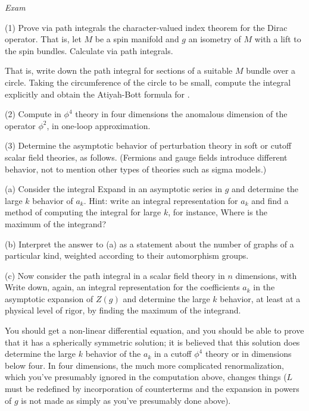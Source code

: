 

\overfullrule=0pt
{\it Exam}

(1) Prove via path integrals the character-valued index theorem for the Dirac 
operator.
That is, let $M$ be a spin manifold and $g$ an isometry of $M$ with a lift to 
the
spin bundles.  Calculate
\eqn{}
via path integrals.

That is, write down the path integral for sections of a suitable $M$ bundle
over a circle.  Taking the circumference of the circle to be small, compute
the integral explicitly and obtain the Atiyah-Bott formula for \hgg.

(2) Compute in $\phi^4$ theory in four dimensions the anomalous dimension of 
the
operator $\phi^2$, in one-loop approximation.

(3) Determine the asymptotic behavior of perturbation theory in soft or cutoff
scalar field theories, as follows.  (Fermions and gauge fields introduce 
different
behavior, not to mention other types of theories such as sigma models.)

(a) Consider the integral
\eqn{}
Expand in an asymptotic series in $g$
\eqn{}
and determine the large $k$ behavior of $a_k$.   Hint: write an integral 
representation
for $a_k$ and find a method of computing the integral for large $k$, for 
instance,
Where is the maximum of the integrand?

(b) Interpret the answer to (a) as a statement about the number of graphs of
a particular kind, weighted according to their automorphism groups.

(c) Now consider the path integral
\eqn{}
in a scalar field theory in $n$ dimensions, with 
\eqn{}
Write down, again, an integral representation for the coefficients $a_k$
in the asymptotic expansion of $Z(g)$ and determine the large $k$ behavior,
at least at a physical level of rigor, by finding the maximum of the integrand.

You should get a non-linear differential equation, and you should be able to 
prove
that it has a spherically symmetric solution; it is believed that this solution
does determine the large $k$ behavior of the $a_k$ in a cutoff $\phi^4$ theory
or in dimensions below four.  In four dimensions, the  much more complicated
renormalization, which you've presumably ignored in the computation above,
changes things ($L$ must be redefined by incorporation of counterterms and the
expansion in powers of $g$ is not made as simply as you've presumably done 
above).

